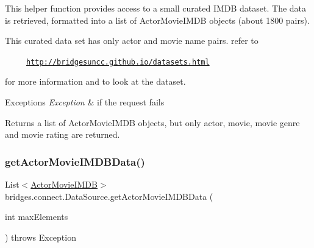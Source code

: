 This helper function provides access to a small curated I\+M\+DB dataset. The data is retrieved, formatted into a list of Actor\+Movie\+I\+M\+DB objects (about 1800 pairs).

This curated data set has only actor and movie name pairs. refer to 

~~~~~\href{http://bridgesuncc.github.io/datasets.html}{\tt http\+://bridgesuncc.\+github.\+io/datasets.\+html} 

for more information and to look at the dataset.


\begin{DoxyExceptions}{Exceptions}
{\em Exception} & if the request fails\\
\hline
\end{DoxyExceptions}
\begin{DoxyReturn}{Returns}
a list of Actor\+Movie\+I\+M\+DB objects, but only actor, movie, movie genre and movie rating are returned. 
\end{DoxyReturn}
\mbox{\label{classbridges_1_1connect_1_1_data_source_a3b3c231fee0ce328fb8f79807742aecd}} 
\subsubsection{\texorpdfstring{get\+Actor\+Movie\+I\+M\+D\+B\+Data()}{getActorMovieIMDBData()}\hspace{0.1cm}{\footnotesize\ttfamily [2/2]}}
{\footnotesize\ttfamily List$<$\hyperlink{classbridges_1_1data__src__dependent_1_1_actor_movie_i_m_d_b}{Actor\+Movie\+I\+M\+DB}$>$ bridges.\+connect.\+Data\+Source.\+get\+Actor\+Movie\+I\+M\+D\+B\+Data (\begin{DoxyParamCaption}\item[{int}]{max\+Elements }\end{DoxyParamCaption}) throws Exception}

\mbox{\label{classbridges_1_1connect_1_1_data_source_ae44e4ed7879e2755f8c66a335d8b6ad5}} 
